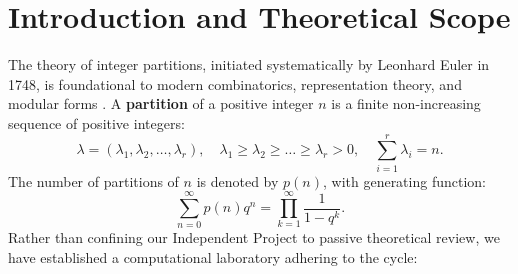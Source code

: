 \documentclass[11pt,a4paper]{article}
\begin{document}
\section{Introduction and Theoretical Scope}
The theory of integer partitions, initiated systematically by Leonhard Euler in 1748, is foundational to modern combinatorics, representation theory, and modular forms \cite{andrews1976}. A \textbf{partition} of a positive integer $n$ is a finite non-increasing sequence of positive integers:
\begin{equation}
\lambda = (\lambda_1, \lambda_2, \dots, \lambda_r), \quad \lambda_1 \ge \lambda_2 \ge \dots \ge \lambda_r > 0, \quad \sum_{i=1}^r \lambda_i = n.
\end{equation}
The number of partitions of $n$ is denoted by $p(n)$, with generating function:
\begin{equation}
\sum_{n=0}^\infty p(n) q^n = \prod_{k=1}^\infty \frac{1}{1 - q^k}.
\end{equation}
Rather than confining our Independent Project to passive theoretical review, we have established a computational laboratory adhering to the cycle:
\end{document}
